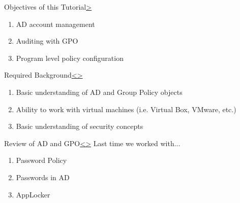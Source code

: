 \documentclass[12pt]{extarticle}
\newenvironment{instructionblock}{\Large\bgroup}{\egroup}
\newcommand{\ben}{\begin{enumerate}}
\newcommand{\een}{\end{enumerate}}
\begin{document}
\pagebreak
{}
\setcounter{section}{1}




	\pagebreak
	\begin{slide}{Objectives of this Tutorial}{\hyperref[slide 2]{\textgreater}}
		\begin{instructionblock}
				\ben 
					\item AD account management
					\item Auditing with GPO
					\item Program level policy configuration
				\een
		\end{instructionblock}
	\end{slide}
	\vfill
	
	
	
	
	\pagebreak	
	\begin{slide}{Required Background}{\hyperref[slide 1]{\textless}\hyperref[slide 3]{\textgreater}}
		\begin{instructionblock}
			\ben
				\item Basic understanding of AD and Group Policy objects
				\item Ability to work with virtual machines (i.e. Virtual Box, VMware, etc.)
				\item Basic understanding of security concepts
			\een
		\end{instructionblock}
	\end{slide}
	
	\pagebreak
	
	

\pagebreak
\begin{slide}{Review of AD and GPO}{\hyperref[slide 2]{\textless}\hyperref[slide 4]{\textgreater}}
	\begin{instructionblock}
	Last time we worked with...
		\ben
			\item Password Policy
			\item Passwords in AD
			\item AppLocker 
		\een
	\end{instructionblock}
\end{slide}
\end{document}

